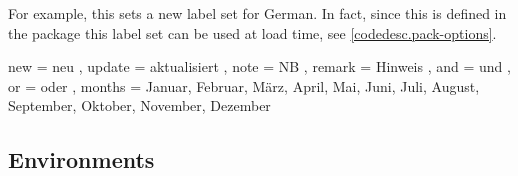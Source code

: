 \documentclass{article}
\begin{document}
For example, this sets a new label set for German. In fact, since this is defined in the package  this label set can be used at load time, see \ref{codedesc.pack-options}.
\begin{codestore}[labelset]
  {
    new     = neu           ,
    update  = aktualisiert  ,
    note    = NB            ,
    remark  = Hinweis       ,
    and     = und           ,
    or      = oder          ,
    months  = 
      {
        Januar, Februar, März, April, 
        Mai, Juni, Juli, August, 
        September, Oktober, November, Dezember
      }
  }
\end{codestore}




\subsection{Environments}\label{desc-env}
\end{document}
